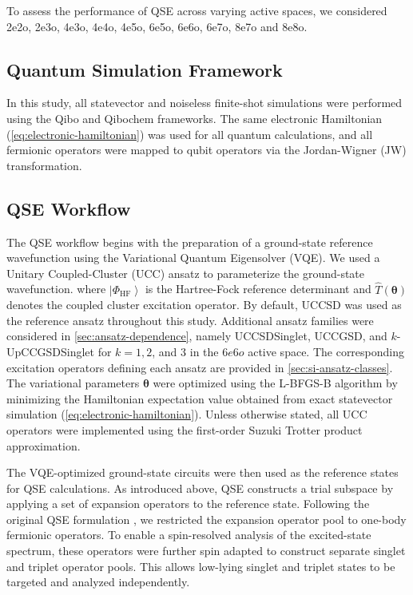 To assess the performance of QSE across varying active spaces, we considered 2e2o, 2e3o, 4e3o, 4e4o, 4e5o, 6e5o, 6e6o, 6e7o, 8e7o and 8e8o.

\subsection{Quantum Simulation Framework}
In this study, all statevector and noiseless finite-shot simulations were performed using the Qibo and Qibochem \cite{qibo2021,qibochem2024zenodo} frameworks. The same electronic Hamiltonian (\cref{eq:electronic-hamiltonian}) was used for all quantum calculations, and all fermionic operators were mapped to qubit operators via the Jordan-Wigner (JW) transformation.

\subsection{QSE Workflow}
The QSE workflow begins with the preparation of a ground-state reference wavefunction using the Variational Quantum Eigensolver (VQE). 
We used a Unitary Coupled-Cluster (UCC) ansatz to parameterize the ground-state wavefunction. 
\UCCReferenceStateEquation
where $\left|\Phi_{\mathrm{HF}}\right\rangle$ is the Hartree-Fock reference determinant and $\hat{T}(\boldsymbol{\theta})$ denotes the coupled cluster excitation operator.
By default, UCCSD was used as the reference ansatz throughout this study. Additional ansatz families were considered in \cref{sec:ansatz-dependence}, namely UCCSDSinglet, UCCGSD, and $k$-UpCCGSDSinglet \cite{Anand2022UCCReview,Diniz2021GeneralisedAnsatzAdaptations, Lee2018GeneralisedAnsatzOriginal} for $k=1,2$, and $3$ in the $6e6o$ active space. 
The corresponding excitation operators defining each ansatz are provided in \cref{sec:si-ansatz-classes}.
The variational parameters $\boldsymbol{\theta}$ were optimized using the L-BFGS-B algorithm by minimizing the Hamiltonian expectation value obtained from exact statevector simulation (\cref{eq:electronic-hamiltonian}).
Unless otherwise stated, all UCC operators were implemented using the first-order Suzuki Trotter product approximation.

The VQE-optimized ground-state circuits were then used as the reference states for QSE calculations. 
As introduced above, QSE constructs a trial subspace by applying a set of expansion operators to the reference state. Following the original QSE formulation \cite{mcclean2017qse}, we restricted the expansion operator pool to one-body fermionic operators. 
To enable a spin-resolved analysis of the excited-state spectrum, these operators were further spin adapted to construct separate singlet and triplet operator pools. This allows low-lying singlet and triplet states to be targeted and analyzed independently. 

